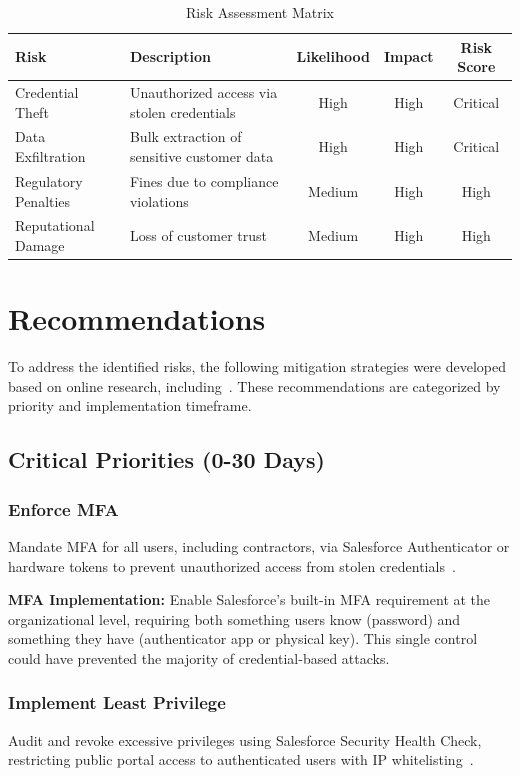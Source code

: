 \documentclass[12pt,a4paper]{article}
\begin{document}
\begin{table}[H]
\caption{Risk Assessment Matrix}
\label{tab:risk}
\centering
\begin{tabularx}{\textwidth}{|l|X|c|c|c|}
\hline
\rowcolor{primary!20}
\textbf{Risk} & \textbf{Description} & \textbf{Likelihood} & \textbf{Impact} & \textbf{Risk Score} \\
\hline
\rowcolor{highlight!20}
Credential Theft & Unauthorized access via stolen credentials & High & High & Critical \\
Data Exfiltration & Bulk extraction of sensitive customer data & High & High & Critical \\
Regulatory Penalties & Fines due to compliance violations & Medium & High & High \\
Reputational Damage & Loss of customer trust & Medium & High & High \\
\hline
\end{tabularx}
\end{table}

\section{Recommendations}
To address the identified risks, the following mitigation strategies were developed based on online research, including~\cite{capstorm2023,foundhq2025,onilab2024}. These recommendations are categorized by priority and implementation timeframe.

\subsection{Critical Priorities (0-30 Days)}
\subsubsection{Enforce MFA}
Mandate MFA for all users, including contractors, via Salesforce Authenticator or hardware tokens to prevent unauthorized access from stolen credentials~\cite{foundhq2025}.

\begin{keyfinding}
\textbf{MFA Implementation:} Enable Salesforce's built-in MFA requirement at the organizational level, requiring both something users know (password) and something they have (authenticator app or physical key). This single control could have prevented the majority of credential-based attacks.
\end{keyfinding}

\subsubsection{Implement Least Privilege}
Audit and revoke excessive privileges using Salesforce Security Health Check, restricting public portal access to authenticated users with IP whitelisting~\cite{onilab2024}.
\end{document}
